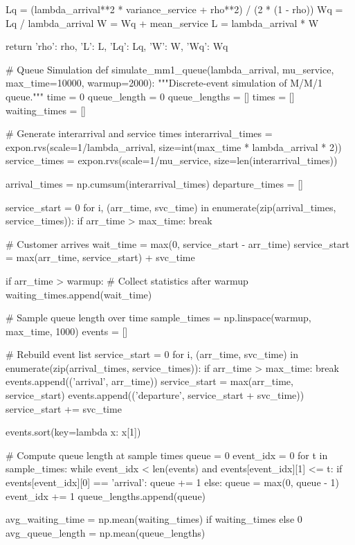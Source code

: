 \documentclass[a4paper, 11pt]{article}
\begin{document}
\begin{pycode}
    Lq = (lambda_arrival**2 * variance_service + rho**2) / (2 * (1 - rho))
    Wq = Lq / lambda_arrival
    W = Wq + mean_service
    L = lambda_arrival * W

    return {'rho': rho, 'L': L, 'Lq': Lq, 'W': W, 'Wq': Wq}

# Queue Simulation
def simulate_mm1_queue(lambda_arrival, mu_service, max_time=10000, warmup=2000):
    """Discrete-event simulation of M/M/1 queue."""
    time = 0
    queue_length = 0
    queue_lengths = []
    times = []
    waiting_times = []

    # Generate interarrival and service times
    interarrival_times = expon.rvs(scale=1/lambda_arrival, size=int(max_time * lambda_arrival * 2))
    service_times = expon.rvs(scale=1/mu_service, size=len(interarrival_times))

    arrival_times = np.cumsum(interarrival_times)
    departure_times = []

    service_start = 0
    for i, (arr_time, svc_time) in enumerate(zip(arrival_times, service_times)):
        if arr_time > max_time:
            break

        # Customer arrives
        wait_time = max(0, service_start - arr_time)
        service_start = max(arr_time, service_start) + svc_time

        if arr_time > warmup:  # Collect statistics after warmup
            waiting_times.append(wait_time)

    # Sample queue length over time
    sample_times = np.linspace(warmup, max_time, 1000)
    events = []

    # Rebuild event list
    service_start = 0
    for i, (arr_time, svc_time) in enumerate(zip(arrival_times, service_times)):
        if arr_time > max_time:
            break
        events.append(('arrival', arr_time))
        service_start = max(arr_time, service_start)
        events.append(('departure', service_start + svc_time))
        service_start += svc_time

    events.sort(key=lambda x: x[1])

    # Compute queue length at sample times
    queue = 0
    event_idx = 0
    for t in sample_times:
        while event_idx < len(events) and events[event_idx][1] <= t:
            if events[event_idx][0] == 'arrival':
                queue += 1
            else:
                queue = max(0, queue - 1)
            event_idx += 1
        queue_lengths.append(queue)

    avg_waiting_time = np.mean(waiting_times) if waiting_times else 0
    avg_queue_length = np.mean(queue_lengths)


\end{pycode}
\end{document}

